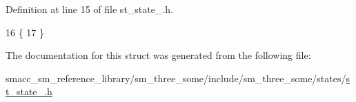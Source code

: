 Definition at line 15 of file st\+\_\+state\+\_.\+h.


\begin{DoxyCode}
16     \{
17     \}
\end{DoxyCode}


The documentation for this struct was generated from the following file\+:\begin{DoxyCompactItemize}
\item 
smacc\+\_\+sm\+\_\+reference\+\_\+library/sm\+\_\+three\+\_\+some/include/sm\+\_\+three\+\_\+some/states/\hyperlink{sm__three__some_2include_2sm__three__some_2states_2st__state__4_8h}{st\+\_\+state\+\_.\+h}\end{DoxyCompactItemize}
